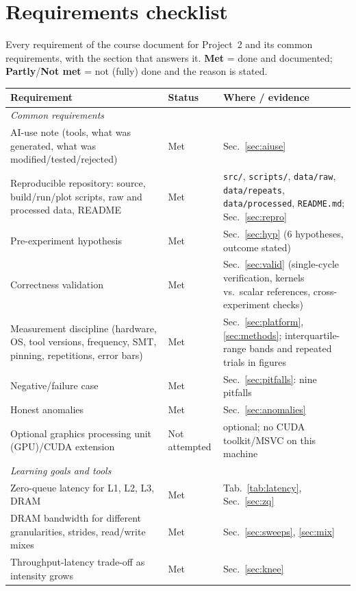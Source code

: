 \documentclass{article}
\begin{document}
\section{Requirements checklist}\label{sec:checklist}
Every requirement of the course document \cite{course} for Project~2 and its common requirements, with the section that answers it. \textbf{Met} = done and documented; \textbf{Partly}/\textbf{Not met} = not (fully) done and the reason is stated.
{\footnotesize
\begin{longtable}{p{6.0cm}p{1.6cm}p{8.0cm}}
\toprule
\textbf{Requirement} & \textbf{Status} & \textbf{Where / evidence} \\
\midrule
\endhead
\multicolumn{3}{l}{\textit{Common requirements}} \\
AI-use note (tools, what was generated, what was modified/tested/rejected) & Met & Sec.~\ref{sec:aiuse} \\
Reproducible repository: source, build/run/plot scripts, raw and processed data, README & Met & \texttt{src/}, \texttt{scripts/}, \texttt{data/raw}, \texttt{data/repeats}, \texttt{data/processed}, \texttt{README.md}; Sec.~\ref{sec:repro} \\
Pre-experiment hypothesis & Met & Sec.~\ref{sec:hyp} (6 hypotheses, outcome stated) \\
Correctness validation & Met & Sec.~\ref{sec:valid} (single-cycle verification, kernels vs.\ scalar references, cross-experiment checks) \\
Measurement discipline (hardware, OS, tool versions, frequency, SMT, pinning, repetitions, error bars) & Met & Sec.~\ref{sec:platform}, \ref{sec:methods}; interquartile-range bands and repeated trials in figures \\
Negative/failure case & Met & Sec.~\ref{sec:pitfalls}: nine pitfalls \\
Honest anomalies & Met & Sec.~\ref{sec:anomalies} \\
Optional graphics processing unit (GPU)/CUDA extension & Not attempted & optional; no CUDA toolkit/MSVC on this machine \\
\midrule
\multicolumn{3}{l}{\textit{Learning goals and tools}} \\
Zero-queue latency for L1, L2, L3, DRAM & Met & Tab.~\ref{tab:latency}, Sec.~\ref{sec:zq} \\
DRAM bandwidth for different granularities, strides, read/write mixes & Met & Sec.~\ref{sec:sweeps}, \ref{sec:mix} \\
Throughput-latency trade-off as intensity grows & Met & Sec.~\ref{sec:knee} \\

\end{longtable}}
\end{document}
